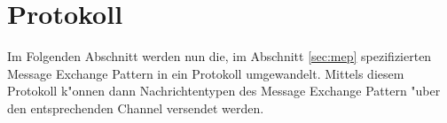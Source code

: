 %
%


\section{Protokoll}
\label{sec:protokoll}
Im Folgenden Abschnitt werden nun die, im Abschnitt \ref{sec:mep} spezifizierten Message Exchange Pattern in ein Protokoll umgewandelt. Mittels diesem Protokoll k"onnen dann Nachrichtentypen des Message Exchange Pattern "uber den entsprechenden Channel versendet werden.

